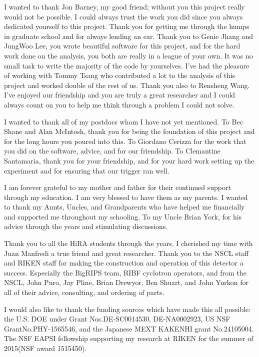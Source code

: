 \documentclass{altmsuphddissertation}
\begin{document}
\begin{acknowledgment}
I wanted to thank Jon Barney, my good friend; without you this project really would not be possible. I could always trust the work you did since you always dedicated yourself to this project. Thank you for getting me through the humps in graduate school and for always lending an ear. Thank you to Genie Jhang and JungWoo Lee, you wrote beautiful software for this project, and for the hard work done on the analysis, you both are really in a league of your own. It was no small task to write the majority of the code by yourselves. I've had the pleasure of working with Tommy Tsang who contributed a lot to the analysis of this project and worked double of the rest of us. Thank you also to Rensheng Wang. I've enjoyed our friendship and you are truly a great researcher and I could always count on you to help me think through a problem I could not solve. 

I wanted to thank all of my postdocs whom I have not yet mentioned. To Bec Shane and Alan McIntosh, thank you for being the foundation of this project and for the long hours you poured into this. To Giordano Cerizza for the work that you did on the software, advice, and for our friendship. To Clemantine Santamaria, thank you for your friendship, and for your hard work setting up the experiment and for ensuring that our trigger ran well.

I am forever grateful to my mother and father for their continued support through my education. I am very blessed to have them as my parents. I wanted to thank my Aunts, Uncles, and Grandparents who have helped me financially and supported me throughout my schooling. To my Uncle Brian York, for his advice through the years and stimulating discussions. 

Thank you to all the HiRA students through the years. I cherished my time with Juan Manfredi a true friend and great researcher. Thank you to the NSCL staff and RIKEN staff for making the construction and operation of this detector a success. Especially the BigRIPS team, RIBF cyclotron operators, and from the NSCL, John Puro, Jay Pline, Brian Drewyor, Ben Shuart, and John Yurkon for all of their advice, consulting, and ordering of parts. 

I would also like to thank the funding sources which have made this all possible: the U.S. DOE under Grant Nos.DE-SC0014530, DE-NA0002923, US NSF GrantNo.PHY-1565546, and the Japanese MEXT KAKENHI grant No.24105004. The NSF EAPSI fellowship supporting my research at RIKEN for the summer of 2015(NSF award 1515450).

\end{acknowledgment}
\end{document}
